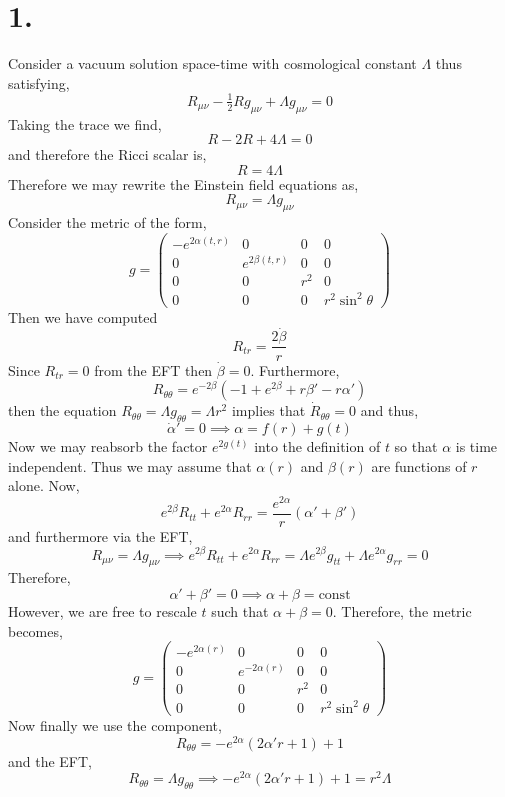 \documentclass[12pt]{article}
\begin{document}

\section*{1.}

Consider a vacuum solution space-time with cosmological constant $\Lambda$ thus satisfying,
\[ R_{\mu \nu} - \tfrac{1}{2} R g_{\mu \nu} + \Lambda g_{\mu \nu} = 0 \]
Taking the trace we find,
\[ R - 2 R + 4 \Lambda  = 0 \]
and therefore the Ricci scalar is,
\[ R = 4 \Lambda \]
Therefore we may rewrite the Einstein field equations as,
\[ R_{\mu \nu} = \Lambda g_{\mu \nu} \]
Consider the metric of the form,
\[ g =
\begin{pmatrix}
-e^{2 \alpha(t,r)} & 0 & 0 & 0
\\
0 & e^{2 \beta(t,r)} & 0 & 0 
\\
0 & 0 & r^2 & 0
\\
0 & 0 & 0 & r^2 \sin^2{\theta}
\end{pmatrix} \]
Then we have computed 
\[ R_{tr} = \frac{2 \dot{\beta}}{r} \]
Since $R_{tr} = 0$ from the EFT then $\dot{\beta} = 0$. Furthermore,
\[ R_{\theta \theta} = e^{-2 \beta}(-1 + e^{2 \beta} + r \beta' - r \alpha') \] 
then the equation $R_{\theta \theta} = \Lambda g_{\theta \theta} = \Lambda r^2$ implies that $\dot{R}_{\theta \theta} = 0$ and thus,
\[ \dot{\alpha}' = 0 \implies \alpha = f(r) + g(t) \]
Now we may reabsorb the factor $e^{2g(t)}$ into the definition of $t$ so that $\alpha$ is time independent. Thus we may assume that $\alpha(r)$ and $\beta(r)$ are functions of $r$ alone. Now,
\[ e^{2 \beta} R_{tt} + e^{2 \alpha} R_{rr} = \frac{e^{2 \alpha}}{r} (\alpha' + \beta') \]
and furthermore via the EFT,
\[ R_{\mu \nu} = \Lambda g_{\mu \nu} \implies e^{2 \beta} R_{tt} + e^{2 \alpha} R_{rr} = \Lambda e^{2 \beta} g_{tt} + \Lambda e^{2 \alpha} g_{rr} = 0 \]
Therefore,
\[ \alpha' + \beta' = 0 \implies \alpha + \beta = \text{const} \]
However, we are free to rescale $t$ such that $\alpha + \beta = 0$. Therefore, the metric becomes,
\[ g =
\begin{pmatrix}
-e^{2 \alpha(r)} & 0 & 0 & 0
\\
0 & e^{-2 \alpha(r)} & 0 & 0 
\\
0 & 0 & r^2 & 0
\\
0 & 0 & 0 & r^2 \sin^2{\theta}
\end{pmatrix} \]
Now finally we use the component,
\[ R_{\theta \theta} = -e^{2 \alpha} (2 \alpha' r + 1) + 1 \]
and the EFT,
\[ R_{\theta \theta} = \Lambda g_{\theta \theta} \implies -e^{2 \alpha} (2 \alpha' r + 1) + 1 = r^2 \Lambda \]
\end{document}
